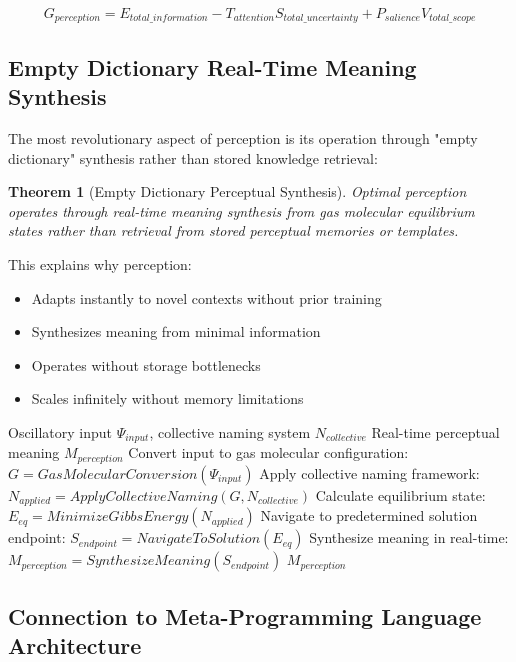 \documentclass[12pt]{article}
\newtheorem{theorem}{Theorem}
\begin{document}
$$G_{perception} = E_{total\_information} - T_{attention} S_{total\_uncertainty} + P_{salience} V_{total\_scope}$$

\subsection{Empty Dictionary Real-Time Meaning Synthesis}

The most revolutionary aspect of perception is its operation through "empty dictionary" synthesis rather than stored knowledge retrieval:

\begin{theorem}[Empty Dictionary Perceptual Synthesis]
Optimal perception operates through real-time meaning synthesis from gas molecular equilibrium states rather than retrieval from stored perceptual memories or templates.
\end{theorem}

This explains why perception:
\begin{itemize}
\item Adapts instantly to novel contexts without prior training
\item Synthesizes meaning from minimal information
\item Operates without storage bottlenecks
\item Scales infinitely without memory limitations
\end{itemize}

\begin{algorithm}[H]
\caption{Empty Dictionary Perceptual Synthesis}
\begin{algorithmic}[1]
\REQUIRE Oscillatory input $\Psi_{input}$, collective naming system $N_{collective}$
\ENSURE Real-time perceptual meaning $M_{perception}$
\STATE Convert input to gas molecular configuration: $G = GasMolecularConversion(\Psi_{input})$
\STATE Apply collective naming framework: $N_{applied} = ApplyCollectiveNaming(G, N_{collective})$
\STATE Calculate equilibrium state: $E_{eq} = MinimizeGibbsEnergy(N_{applied})$
\STATE Navigate to predetermined solution endpoint: $S_{endpoint} = NavigateToSolution(E_{eq})$
\STATE Synthesize meaning in real-time: $M_{perception} = SynthesizeMeaning(S_{endpoint})$
\RETURN $M_{perception}$ 
\end{algorithmic}
\end{algorithm}

\subsection{Connection to Meta-Programming Language Architecture}
\end{document}
